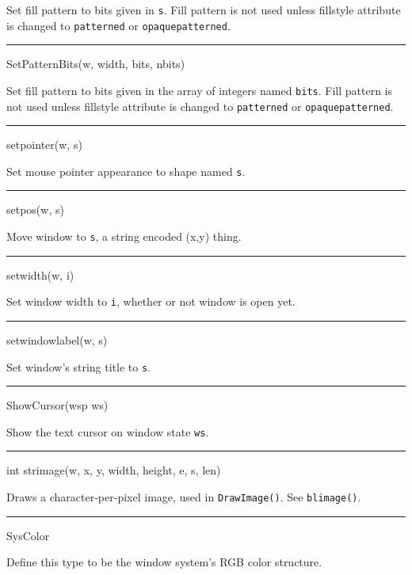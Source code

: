 Set fill pattern to bits given in \texttt{s}. Fill pattern is not used
unless fillstyle attribute is changed to
\texttt{{\textquotedbl}patterned{\textquotedbl}} or
\texttt{{\textquotedbl}opaquepatterned{\textquotedbl}}.


{\sffamily\bfseries
\bigskip\hrule\vspace{0.1cm}
\noindent
SetPatternBits(w, width, bits, nbits)}


Set fill pattern to bits given in the array of integers named
\texttt{bits}. Fill pattern is not used unless fillstyle attribute is
changed to \texttt{{\textquotedbl}patterned{\textquotedbl}} or
\texttt{{\textquotedbl}opaquepatterned{\textquotedbl}}.


{\sffamily\bfseries
\bigskip\hrule\vspace{0.1cm}
\noindent
setpointer(w, s)}


Set mouse pointer appearance to shape named \texttt{s}.


{\sffamily\bfseries
\bigskip\hrule\vspace{0.1cm}
\noindent
setpos(w, s)}


Move window to \texttt{s}, a string encoded
{\textquotedbl}(x,y){\textquotedbl} thing.


{\sffamily\bfseries
\bigskip\hrule\vspace{0.1cm}
\noindent
setwidth(w, i)}


Set window width to \texttt{i}, whether or not window is open yet.


{\sffamily\bfseries
\bigskip\hrule\vspace{0.1cm}
\noindent
setwindowlabel(w, s)}


Set window's string title to \texttt{s}.


{\sffamily\bfseries
\bigskip\hrule\vspace{0.1cm}
\noindent
ShowCursor(wsp ws)}


Show the text cursor on window state \texttt{ws}.


{\sffamily\bfseries
\bigskip\hrule\vspace{0.1cm}
\noindent
int strimage(w, x, y, width, height, e, s, len)}


Draws a character-per-pixel image, used in \texttt{DrawImage()}. See
\texttt{blimage()}.


{\sffamily\bfseries
\bigskip\hrule\vspace{0.1cm}
\noindent
SysColor}


Define this type to be the window system's RGB color structure.


